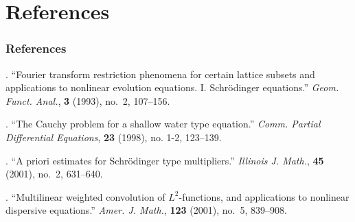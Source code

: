 \documentclass[handout]{beamer}
\numberwithin{equation}{section}
\begin{document}
%
%
\section{References}
\begin{thebibliography}{10}
\newcommand{\enquote}[1]{``#1''}

\begin{frame}
	\frametitle{References}
.
\newblock \enquote{Fourier transform restriction phenomena for certain lattice
  subsets and applications to nonlinear evolution equations. {I}.
  {S}chr{\"o}dinger equations.}
\newblock \emph{Geom. Funct. Anal.}, \textbf{3} (1993), no.~2, 107--156.

.
\newblock \enquote{The {C}auchy problem for a shallow water type equation.}
\newblock \emph{Comm. Partial Differential Equations}, \textbf{23} (1998), no.
  1-2, 123--139.

.
\newblock \enquote{A priori estimates for {S}chr{\"o}dinger type multipliers.}
\newblock \emph{Illinois J. Math.}, \textbf{45} (2001), no.~2, 631--640.

.
\newblock \enquote{Multilinear weighted convolution of {$L^2$}-functions, and
  applications to nonlinear dispersive equations.}
\newblock \emph{Amer. J. Math.}, \textbf{123} (2001), no.~5, 839--908.
\end{frame}
\end{thebibliography}


		
\end{document}
